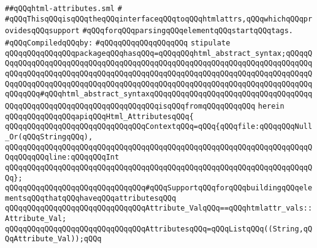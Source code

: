 \label{src/lib/html/html-attributes.api}
\verb|##qQQqhtml-attributes.sml|\newline
\verb|#|\newline
\verb|#qQQqThisqQQqisqQQqtheqQQqinterfaceqQQqtoqQQqhtmlattrs,qQQqwhichqQQqprovidesqQQqsupport|\newline
\verb|#qQQqforqQQqparsingqQQqelementqQQqstartqQQqtags.|\newline
\newline
\verb|#qQQqCompiledqQQqby:|\newline
\verb|#qQQqqQQqqQQqqQQqqQQq|\newline
\newline
\newline
\verb|stipulate|\newline
\verb|qQQqqQQqqQQqqQQqpackageqQQqhasqQQq=qQQqqQQqhtml_abstract_syntax;qQQqqQQqqQQqqQQqqQQqqQQqqQQqqQQqqQQqqQQqqQQqqQQqqQQqqQQqqQQqqQQqqQQqqQQqqQQqqQQqqQQqqQQqqQQqqQQqqQQqqQQqqQQqqQQqqQQqqQQqqQQqqQQqqQQqqQQqqQQqqQQqqQQqqQQqqQQqqQQqqQQqqQQqqQQqqQQqqQQqqQQqqQQqqQQqqQQqqQQqqQQqqQQqqQQqqQQqqQQqqQQq#qQQqhtml_abstract_syntaxqQQqqQQqqQQqqQQqqQQqqQQqqQQqqQQqqQQqqQQqqQQqqQQqqQQqqQQqqQQqqQQqqQQqqQQqisqQQqfromqQQqqQQqqQQq|\newline
\verb|herein|\newline
\newline
\verb|qQQqqQQqqQQqqQQqapiqQQqHtml_AttributesqQQq{|\newline
\newline
\verb|qQQqqQQqqQQqqQQqqQQqqQQqqQQqqQQqContextqQQq=qQQq{qQQqfile:qQQqqQQqNull_Or(qQQqStringqQQq),|\newline
\verb|qQQqqQQqqQQqqQQqqQQqqQQqqQQqqQQqqQQqqQQqqQQqqQQqqQQqqQQqqQQqqQQqqQQqqQQqqQQqqQQqline:qQQqqQQqInt|\newline
\verb|qQQqqQQqqQQqqQQqqQQqqQQqqQQqqQQqqQQqqQQqqQQqqQQqqQQqqQQqqQQqqQQqqQQqqQQq};|\newline
\newline
\verb|qQQqqQQqqQQqqQQqqQQqqQQqqQQqqQQq#qQQqSupportqQQqforqQQqbuildingqQQqelementsqQQqthatqQQqhaveqQQqattributesqQQq|\newline
\verb|qQQqqQQqqQQqqQQqqQQqqQQqqQQqqQQqAttribute_ValqQQq==qQQqhtmlattr_vals::Attribute_Val;|\newline
\verb|qQQqqQQqqQQqqQQqqQQqqQQqqQQqqQQqAttributesqQQq=qQQqListqQQq((String,qQQqAttribute_Val));qQQq|\newline
\newline

